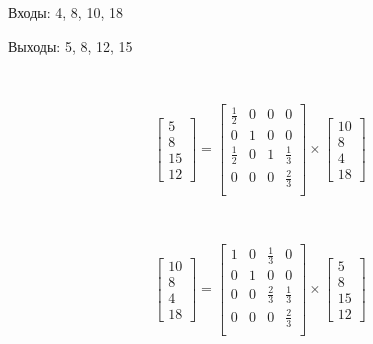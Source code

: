 \documentclass[twoside, a3paper]{report}
\begin{document}
\newpage
\thispagestyle{empty}
\mbox{}
\newpage

Входы: 4, 8, 10, 18

Выходы: 5, 8, 12, 15

\

$$
\left[
\begin{matrix}
	5 \\ 8 \\ 15 \\ 12
\end{matrix}
\right]
=
\left[
\begin{matrix}
	\frac12 & 0 & 0 & 0 \\
	0 		& 1 & 0 & 0 \\
	\frac12 & 0 & 1	& \frac13 \\
	0		& 0 & 0 & \frac23 \\
\end{matrix}
\right]
\times
\left[
\begin{matrix}
	10 \\ 8 \\ 4 \\ 18
\end{matrix}
\right]
$$

\

$$
\left[
\begin{matrix}
	10 \\ 8 \\ 4 \\ 18
\end{matrix}
\right]
=
\left[
\begin{matrix}
	1 & 0 & \frac13 & 0 \\
	0 & 1 & 0       & 0 \\
	0 & 0 & \frac23	& \frac13 \\
	0 & 0 & 0       & \frac23 \\
\end{matrix}
\right]
\times
\left[
\begin{matrix}
	5 \\ 8 \\ 15 \\ 12
\end{matrix}
\right]
$$

\
\end{document}
